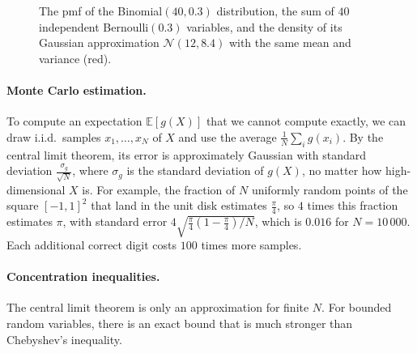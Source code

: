 \documentclass[11pt]{article}
\newcommand{\E}{\mathbb{E}}
\theoremstyle{definition}
\theoremstyle{plain}
\theoremstyle{remark}
\begin{document}
\begin{figure}[ht]
    \centering
    \caption{The pmf of the Binomial$(40, 0.3)$ distribution, the sum of $40$ independent Bernoulli$(0.3)$ variables, and the density of its Gaussian approximation $\mathcal{N}(12, 8.4)$ with the same mean and variance (red).}
    \label{fig:clt}
\end{figure}

\paragraph{Monte Carlo estimation.} To compute an expectation $\E[g(X)]$ that we cannot compute exactly, we can draw i.i.d.\ samples $x_1, \ldots, x_N$ of $X$ and use the average $\frac{1}{N}\sum_i g(x_i)$. By the central limit theorem, its error is approximately Gaussian with standard deviation $\frac{\sigma_g}{\sqrt{N}}$, where $\sigma_g$ is the standard deviation of $g(X)$, no matter how high-dimensional $X$ is. For example, the fraction of $N$ uniformly random points of the square $[-1, 1]^2$ that land in the unit disk estimates $\frac{\pi}{4}$, so $4$ times this fraction estimates $\pi$, with standard error $4\sqrt{\frac{\pi}{4}(1 - \frac{\pi}{4})/N}$, which is $0.016$ for $N = 10\,000$. Each additional correct digit costs $100$ times more samples.

\paragraph{Concentration inequalities.} The central limit theorem is only an approximation for finite $N$. For bounded random variables, there is an exact bound that is much stronger than Chebyshev's inequality.
\end{document}
